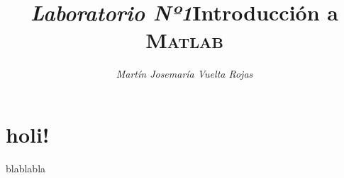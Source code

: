 \documentclass[a4paper,12pt,twoside,final]{article}
\begin{document}
    \title{\textit{\Large Laboratorio Nº1}\linebreak{}\linebreak{}\textbf{\Huge Introducción a \textsc{Matlab}}}
    \author{\emph{Martín Josemaría Vuelta Rojas}}
    \maketitle
    \section{holi!}
    blablabla
\end{document}
